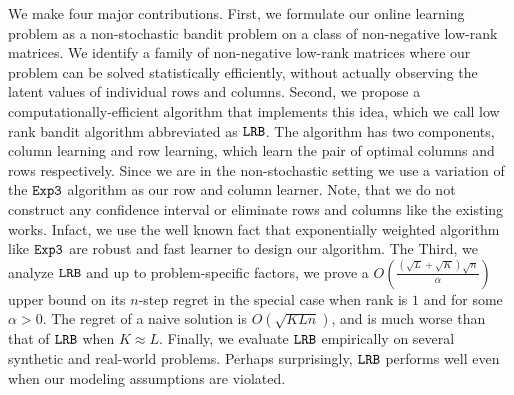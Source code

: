 


We make four major contributions. First, we formulate our online learning problem as a non-stochastic bandit problem on a class of non-negative low-rank matrices. We identify a family of non-negative low-rank matrices where our problem can be solved statistically efficiently, without actually observing the latent values of individual rows and columns. Second, we propose a computationally-efficient algorithm that implements this idea, which we call low rank bandit algorithm abbreviated as ${\tt LRB}$. The algorithm has two components, column learning and row learning, which learn the pair  of optimal columns and rows respectively. Since we are in the non-stochastic setting we use a variation of the ${\tt Exp3}$ \citep{auer2002nonstochastic} algorithm as our row and column learner. Note, that we do not construct any confidence interval or eliminate rows and columns like the existing works. Infact, we use the well known fact that exponentially weighted algorithm like ${\tt Exp3}$ are robust and fast learner to design our algorithm. The Third, we analyze ${\tt LRB}$ and up to problem-specific factors, we prove a $O\left(\frac{\left(\sqrt{L } + \sqrt{K }\right)\sqrt{n}}{\alpha}\right)$ upper bound on its $n$-step regret in the special case when rank is $1$ and for some $\alpha > 0$. The regret of a naive solution is $O(\sqrt{K L n})$, and is much worse than that of ${\tt LRB}$ when $K \approx L$. Finally, we evaluate ${\tt LRB}$ empirically on several synthetic and real-world problems. Perhaps surprisingly, ${\tt LRB}$ performs well even when our modeling assumptions are violated.

